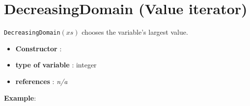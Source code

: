 \section{DecreasingDomain (Value iterator)}\label{decreasingdomain:decreasingdomainvaliterator}\hypertarget{decreasingdomain:decreasingdomainvaliterator}{}
\begin{notedef}
  \texttt{DecreasingDomain}$(xs)$ chooses the variable's largest value.
\end{notedef}

\begin{itemize}
	\item \textbf{Constructor} : 
	\item \textbf{type of variable} : integer
	\item \textbf{references} : \emph{n/a}
\end{itemize}

\textbf{Example}:
%

